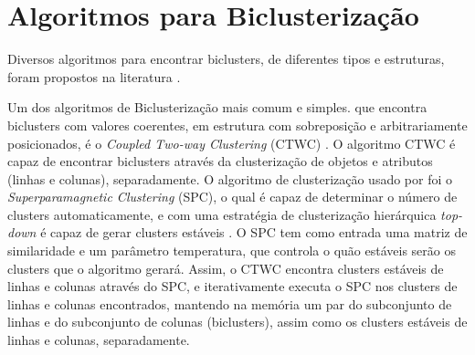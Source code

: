 \documentclass[
    12pt,                %
    oneside,            %
    a4paper,            %
    english,            %
    brazil                %
    ]{abntex2ppgsi}
\begin{document}
\section{Algoritmos para Biclusterização}

Diversos algoritmos para encontrar biclusters, de diferentes tipos e estruturas, foram propostos na literatura \cite{Tanay2005,Madeira2004}.

Um dos algoritmos de Biclusterização mais comum e simples. que encontra biclusters com valores coerentes, em estrutura com sobreposição e arbitrariamente posicionados, é o \textit{Coupled Two-way Clustering} (CTWC) \cite{Getz2000}. O algoritmo CTWC é capaz de encontrar biclusters através da clusterização de objetos e atributos (linhas e colunas), separadamente.
O algoritmo de clusterização usado por  foi o \textit{Superparamagnetic Clustering} (SPC), o qual é capaz de determinar o número de clusters automaticamente, e com uma estratégia de clusterização hierárquica \textit{top-down} é capaz de gerar clusters estáveis \cite{Getz2000}.
O SPC tem como entrada uma matriz de similaridade e um parâmetro temperatura, que controla o quão estáveis serão os clusters que o algoritmo gerará.
Assim, o CTWC encontra clusters estáveis de linhas e colunas através do SPC, e iterativamente executa o SPC nos clusters de linhas e colunas encontrados, mantendo na memória um par do subconjunto de linhas e do subconjunto de colunas (biclusters), assim como os clusters estáveis de linhas e colunas, separadamente.
\end{document}
